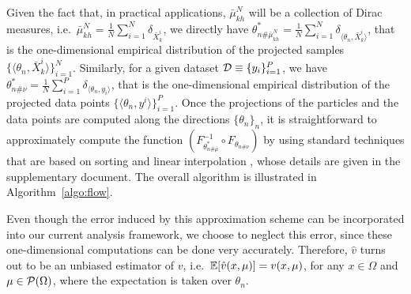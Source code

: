 Given the fact that, in practical applications, $\bar{\mu}^N_{kh}$ will be a collection of Dirac measures, i.e.\ $\bar{\mu}^N_{kh} = \frac1{N} \sum_{i=1}^N \delta_{\bar{X}_{k}^i}$, we directly have $\theta_{n\#\bar{\mu}^N_{kh}}^* = \frac1{N} \sum_{i=1}^N \delta_{\langle \theta_n, \bar{X}_{k}^i \rangle} $, that is the one-dimensional empirical distribution of the projected samples $\{\langle \theta_n, \bar{X}_{k}^i \rangle\}_{i=1}^N$. Similarly, for a given dataset ${\cal D} \equiv \{y_i\}_{i=1}^P$, we have $\theta_{n\#\nu}^* = \frac1{N} \sum_{i=1}^P \delta_{\langle \theta_n, y_i \rangle} $, that is the one-dimensional empirical distribution of the projected data points $\{\langle \theta_n, y^i \rangle\}_{i=1}^P$.  Once the projections of the particles and the data points are computed along the directions $\{\theta_n\}_n$, it is straightforward to approximately compute the function $(F_{\theta_{n\#\bar{\mu}}^*}^{-1} \circ F_{\theta_{n\#\nu}}) $ by using standard techniques that are based on sorting and linear interpolation , whose details are given in the supplementary document. The overall algorithm is illustrated in Algorithm~\ref{algo:flow}.


Even though the error induced by this approximation scheme can be incorporated into our current analysis framework, we choose to neglect this error, since these one-dimensional computations can be done very accurately. Therefore, $\hat{v}$ turns out to be an unbiased estimator of $v$, i.e.\ $\mathbb{E}[\hat{v}(x,\mu)] = v(x,\mu)$, for any $x\in \Omega$ and $\mu \in {\cal P}(\Omega)$, where the expectation is taken over $\theta_n$.











